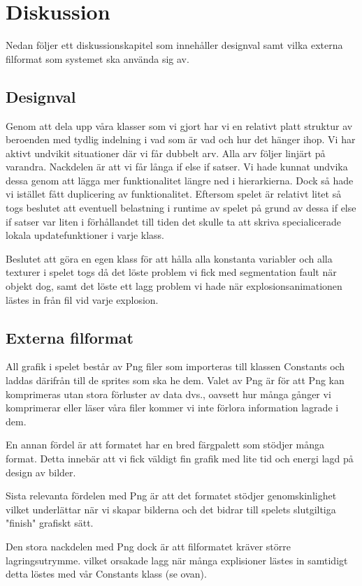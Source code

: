 \documentclass{TDP005mall}
\begin{document}
\pagebreak 
\section {Diskussion}
Nedan följer ett diskussionskapitel som innehåller designval samt vilka externa 
filformat som systemet ska använda sig av.

\subsection{Designval}
Genom att dela upp våra klasser som vi gjort har vi en relativt platt
struktur av beroenden med tydlig indelning i vad som är vad och hur det hänger
ihop. Vi har aktivt undvikit situationer där vi får dubbelt arv. Alla arv följer
linjärt på varandra. Nackdelen är att vi får långa if else if satser. Vi hade kunnat undvika
dessa genom att lägga mer funktionalitet längre ned i hierarkierna. Dock så hade vi istället
fått duplicering av funktionalitet. Eftersom spelet är relativt litet så togs beslutet att
eventuell belastning i runtime av spelet på grund av dessa if else if satser var liten i
förhållandet till tiden det skulle ta att skriva specialicerade lokala updatefunktioner i
varje klass.

Beslutet att göra en egen klass för att hålla alla konstanta variabler och alla texturer i spelet
togs då det löste problem vi fick med segmentation fault när objekt dog, samt det löste ett lagg
problem vi hade när explosionsanimationen lästes in från fil vid varje explosion.

\subsection{Externa filformat}
All grafik i spelet  består av Png filer som importeras till klassen Constants och laddas
därifrån till de sprites som ska he dem. Valet av Png är för att Png kan komprimeras
utan stora förluster av data dvs., oavsett hur många gånger vi komprimerar eller
läser våra filer kommer vi inte förlora information lagrade i dem.

En annan fördel är att formatet har en bred färgpalett som stödjer många format.
Detta innebär att vi fick väldigt fin grafik med lite tid och energi lagd på
design av bilder.

Sista relevanta fördelen med Png är att det formatet stödjer genomskinlighet
vilket underlättar när vi skapar bilderna och det bidrar till spelets
slutgiltiga "finish" grafiskt sätt.

Den stora nackdelen med Png dock är att filformatet kräver större lagringsutrymme.
vilket orsakade lagg när många explisioner lästes in samtidigt detta löstes med vår Constants
klass (se ovan).
\end{document}
